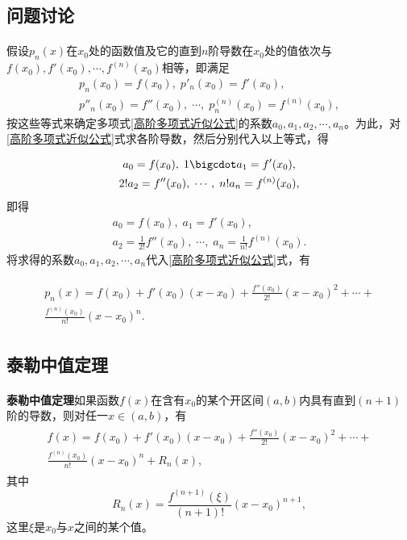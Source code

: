 \subsection{问题讨论}
\paragraph{}
假设$p_n(x)$在$x_0$处的函数值及它的直到$n$阶导数在$x_0$处的值依次与 \\ $f(x_0), f'(x_0), \cdots, f^{(n)}(x_0)$相等，即满足
\begin{gather*}
  p_n(x_0) = f(x_0), \; p'_n(x_0)=f'(x_0), \\
  p''_n(x_0) = f''(x_0), \; \cdots, \; p^{(n)}_n(x_0) = f^{(n)}(x_0),
\end{gather*}
按这些等式来确定多项式\eqref{高阶多项式近似公式}的系数$a_0,a_1,a_2,\cdots,a_n$。为此，对\eqref{高阶多项式近似公式}式求各阶导数，然后分别代入以上等式，得

\begin{gather*}
  a_0 = f(x_0), \; 1 \bigcdot a_1 = f'(x_0), \\
  2!a_2=f''(x_0), \; \cdots, \; n!a_n = f^{(n)}(x_0),
\end{gather*}
即得
\begin{gather*}
  a_0 = f(x_0), \; a_1 = f'(x_0), \\
  a_2 = \frac{1}{2!}f''(x_0), \; \cdots, \; a_n = \frac{1}{n!}f^{(n)}(x_0).
\end{gather*}
将求得的系数$a_0,a_1,a_2, \cdots, a_n$代入\eqref{高阶多项式近似公式}式，有

\begin{align}
\begin{split}
  \label{泰勒多项式}
  p_n(x) = f(x_0) + f'(x_0)(x-x_0) + \frac{f''(x_0)}{2!}(x-x_0)^2 + \cdots + \\
   \frac{f^{(n)}(x_0)}{n!}(x-x_0)^n.
\end{split}
\end{align}

\subsection{泰勒中值定理}
\paragraph{}
\textbf{泰勒中值定理\;}如果函数$f(x)$在含有$x_0$的某个开区间$(a,b)$内具有直到$(n+1)$阶的导数，则对任一$x \in (a,b)$，有
\begin{align}
\begin{split}
  \label{泰勒公式}
  f(x) = f(x_0) + f'(x_0)(x-x_0)+\frac{f''(x_0)}{2!}(x-x_0)^2 + \cdots + \\
  \frac{f^{(n)}(x_0)}{n!}(x-x_0)^n + R_n(x),
\end{split}
\end{align}
其中
\begin{equation}
  R_n(x) = \frac{f^{(n+1)}(\xi)}{(n+1)!}(x-x_0)^{n+1},
\end{equation}
这里$\xi$是$x_0$与$x$之间的某个值。


